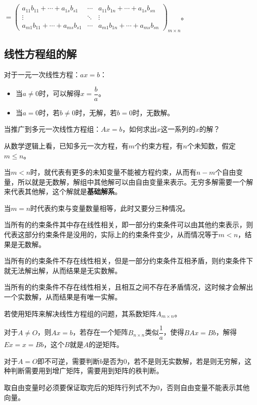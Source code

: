 $=\left(\begin{array}{ccc}
    a_{11}b_{11}+\cdots+a_{1s}b_{s1} & \cdots & a_{11}b_{1n}+\cdots+a_{1s}b_{sn} \\
    \vdots & \ddots & \vdots \\
    a_{m1}b_{11}+\cdots+a_{ms}b_{s1} & \cdots & a_{m1}b_{1n}+\cdots+a_{ms}b_{sn}
\end{array}\right)_{m\times n}\text{。}$

\subsection{线性方程组的解}

对于一元一次线性方程：$ax=b$：

\begin{itemize}
    \item 当$a\neq 0$时，可以解得$x=\dfrac{b}{a}$。
    \item 当$a=0$时，若$b\neq 0$时，无解，若$b=0$时，无数解。
\end{itemize}

当推广到多元一次线性方程组：$Ax=b$，如何求出$x$这一系列的$x$的解？

从数学逻辑上看，已知多元一次方程，有$m$个约束方程，有$n$个未知数，假定$m\leqslant n$。

当$m<n$时，就代表有更多的未知变量不能被方程约束，从而有$n-m$个自由变量，所以就是无数解，解组中其他解可以由自由变量来表示。无穷多解需要一个解来代表其他解，这个解就是\textbf{基础解系}。

当$m=n$时代表约束与变量数量相等，此时又要分三种情况。

当所有的约束条件其中存在线性相关，即一部分约束条件可以由其他约束表示，则代表这部分约束条件是没用的，实际上的约束条件变少，从而情况等于$m<n$，结果是无数解。

当所有的约束条件不存在线性相关，但是一部分约束条件互相矛盾，则约束条件下就无法解出解，从而结果是无实数解。

当所有的约束条件不存在线性相关，且相互之间不存在矛盾情况，这时候才会解出一个实数解，从而结果是有唯一实解。

若使用矩阵来解决线性方程组的问题，其系数矩阵$A_{m\times n}$。

对于$A\neq O$，则$Ax=b$，若存在一个矩阵$B_{n\times n}$类似$\dfrac{1}{a}$，使得$BAx=Bb$，解得$Ex=x=Bb$，这个$B$就是$A$的逆矩阵。

对于$A=O$即不可逆，需要判断$b$是否为0，若不是则无实数解，若是则无穷解，这种判断需要用到增广矩阵，需要用到矩阵的秩判断。

取自由变量时必须要保证取完后的矩阵行列式不为0，否则自由变量不能表示其他向量。


